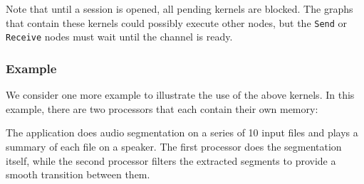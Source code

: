 Note that until a session is opened, all pending kernels are blocked.  The graphs that contain
these kernels could possibly execute other nodes, but the {\tt Send} or {\tt Receive} nodes
must wait until the channel is ready.

\subsubsection*{Example}

We consider one more example to illustrate the use of the above
kernels.  In this example, there are two processors that each contain
their own memory:

\begin{figure}[h]
\begin{center}
\end{center}
\vspace{-12pt}
\end{figure}

The application does audio segmentation on a series of 10 input files
and plays a summary of each file on a speaker.  The first processor
does the segmentation itself, while the second processor filters the
extracted segments to provide a smooth transition between them.

